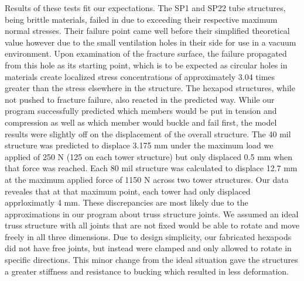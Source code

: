\documentclass[final]{svjour2}
\begin{document}
Results of these tests fit our expectations.  The SP1 and SP22 tube structures, being brittle materials, failed in due to exceeding their respective maximum normal stresses.  Their failure point came well before their simplified theoretical value however due to the small ventilation holes in their side for use in a vacuum environment.  Upon examination of the fracture surface, the failure propagated from this hole as its starting point, which is to be expected as circular holes in materials create localized stress concentrations of approximately 3.04 times greater than the stress elsewhere in the structure.  The hexapod structures, while not pushed to fracture failure, also reacted in the predicted way.  While our program successfully predicted which members would be put in tension and compression as well as which member would buckle and fail first, the model results were slightly off on the displacement of the overall structure.  The 40 mil structure was predicted to displace 3.175 mm under the maximum load we applied of 250 N (125 on each tower structure) but only displaced 0.5 mm when that force was reached. Each 80 mil structure was calculated to displace 12.7 mm at the maximum applied force of 1150 N across two tower structures.  Our data reveales that at that maximum point, each tower had only displaced apprloximatly 4 mm.  These discrepancies are most likely due to the approximations in our program about truss structure joints.  We assumed an ideal truss structure with all joints that are not fixed would be able to rotate and move freely in all three dimensions.  Due to design simplicity, our fabricated hexapods did not have free joints, but instead were clamped and only allowed to rotate in specific directions.  This minor change from the ideal situation gave the structures a greater stiffness and resistance to bucking which resulted in less deformation.
\end{document}
